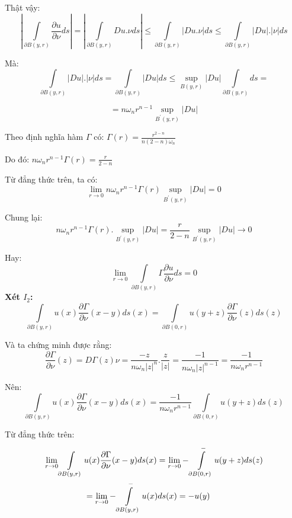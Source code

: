 Thật vậy:
\[
|\int\limits_{\partial B(y,r)} {\frac{{\partial u}}{{\partial \nu }}} ds| = |\int\limits_{\partial B(y,r)} {Du.\nu } ds| \le \int\limits_{\partial B(y,r)} {|Du.\nu |ds \le \int\limits_{\partial B(y,r)} {|Du|.|\nu |ds} } 
\]

 Mà:
\[
\int\limits_{\partial B(y,r)} {|Du|.|\nu |ds}  = \int\limits_{\partial B(y,r)} {|Du|ds}  \le \mathop {\sup }\limits_{B(y,r)} |Du|\int\limits_{\partial B(y,r)} {ds}  = 
\]
 
\[
 = n\omega _n r^{n - 1} \mathop {\sup }\limits_{B^{'}(y,r)} |Du|
\]

Theo định nghĩa hàm $\Gamma$ có:
$
\Gamma (r) = \frac{{r^{2 - n} }}{{n(2 - n)\omega _n }}
$

Do đó:
$
n\omega _n r^{n - 1} \Gamma (r) = \frac{r}{{2 - n}}
$

Từ đẳng thức trên, ta có:
\[
{\mathop {\lim }\limits_{r \to 0} n\omega _n r^{n - 1} \Gamma (r)}{\mathop {\sup }\limits_{B^{'}(y,r)} }|Du| = 0
\]

Chung lại:
\[
n\omega _n r^{n - 1} \Gamma (r).\mathop {\sup }\limits_{B^{'}(y,r)} |Du| = \frac{r}{{2 - n}}\mathop {\sup }\limits_{B^{'}(y,r)} |Du| \to 0
\]

Hay:
\[
\mathop {\lim }\limits_{r \to 0} \int\limits_{\partial B(y,r)} {\Gamma \frac{{\partial u}}
{{\partial \nu }}} ds = 0
\]
\textbf{Xét $I_2$:}
\[
\int\limits_{\partial B(y,r)} {u(x)\frac{{\partial \Gamma }}
{{\partial \nu }}(x - y)ds} (x) = \int\limits_{\partial B(0,r)} {u(y + z)\frac{{\partial \Gamma }}
{{\partial \nu }}(z)ds} (z)
\]

Và ta chứng minh được rằng:
\[
\frac{{\partial \Gamma }}
{{\partial \nu }}(z) = D\Gamma (z)\nu  = \frac{{ - z}}
{{n\omega _n |z|^n }}.\frac{z}
{{|z|}} = \frac{{ - 1}}
{{n\omega _n |z|^{n - 1} }} = \frac{{ - 1}}
{{n\omega _n r^{n - 1} }}
\]

Nên:
\[
\int\limits_{\partial B(y,r)} {u(x)\frac{{\partial \Gamma }}
{{\partial \nu }}(x - y)ds} (x) = \frac{{ - 1}}
{{n\omega _n r^{n - 1} }}\int\limits_{\partial B(0,r)} {u(y + z)ds(z)} 
\]

Từ đẳng thức trên:
\[
\begin{gathered}
  \mathop {\lim }\limits_{r \to 0} \int\limits_{\partial B(y,r)} {u(x)\frac{{\partial \Gamma }}
{{\partial \nu }}(x - y)ds} (x) = \mathop {\lim }\limits_{r \to 0}  - \int\limits_{\partial B(0,r)}^ -  {u(y + z)ds(z)}  \hfill \\
  \quad \quad \quad \quad \quad  = \mathop {\lim }\limits_{r \to 0}  - \int\limits_{\partial B(y,r)}^ -  {u(x)ds(x)}  =  - u(y) \hfill \\ 
\end{gathered} 
\]

